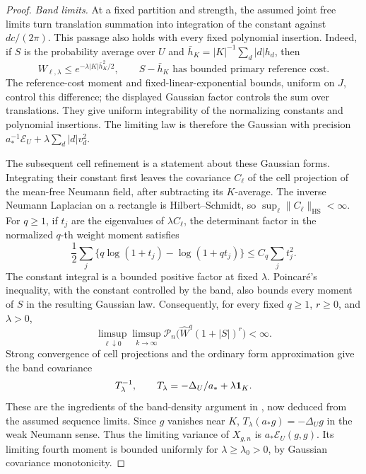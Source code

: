\begin{proof}
\emph{Band limits.}
At a fixed partition and strength, the assumed joint free limits turn
translation summation into integration of the constant against
\(dc/(2\pi)\).  This passage also holds with every fixed polynomial
insertion.  Indeed, if \(S\) is the probability average over \(U\) and
\(\bar h_K=|K|^{-1}\sum_d|d|h_d\), then
\[
 W_{\ell,\lambda}\le
       e^{-\lambda|K|\bar h_K^2/2},
 \qquad S-\bar h_K\text{ has bounded primary reference cost}.
\]
The reference-cost moment and fixed-linear-exponential bounds, uniform
on \(J\), control this difference; the displayed Gaussian factor
controls the sum over translations.  They give uniform integrability
of the normalizing constants and polynomial insertions.  The limiting
law is therefore the Gaussian with precision
\(a_*^{-1}\mathcal E_U+\lambda\sum_d|d|v_d^2\).

The subsequent cell refinement is a statement about these Gaussian
forms.  Integrating their constant first leaves the covariance
\(C_\ell\) of the cell projection of the mean-free Neumann field,
after subtracting its \(K\)-average.  The inverse Neumann Laplacian
on a rectangle is Hilbert--Schmidt, so
\(\sup_\ell\|C_\ell\|_{\mathrm{HS}}<\infty\).  For \(q\ge1\),
if \(t_j\) are the eigenvalues of \(\lambda C_\ell\), the determinant
factor in the normalized \(q\)-th weight moment satisfies
\[
 \frac12\sum_j\{q\log(1+t_j)-\log(1+qt_j)\}
                  \le C_q\sum_jt_j^2.
\]
The constant integral is a bounded positive factor at fixed \(\lambda\).
Poincar\'e's inequality, with the constant controlled by the band,
also bounds every moment of \(S\) in the resulting Gaussian law.
Consequently, for every fixed \(q\ge1\), \(r\ge0\), and \(\lambda>0\),
\begin{equation}\label{eq:profile-band-density}
 \limsup_{\ell\downarrow0}\limsup_{k\to\infty}
 \mathcal P_n\bigl(\widehat W^q(1+|S|)^r\bigr)<\infty.
\end{equation}
Strong convergence of cell projections and the ordinary form
approximation give the band covariance
\begin{equation}\label{eq:profile-band-Gaussian}
 T_\lambda^{-1},\qquad
 T_\lambda=-\Delta_U/a_*+\lambda\mathbf 1_K.
\end{equation}
These are the ingredients of the band-density argument in
\cite[Lemma~3.3]{X}, now deduced from the assumed sequence limits.
Since \(g\) vanishes near \(K\),
\(T_\lambda(a_*g)=-\Delta_Ug\) in the weak Neumann sense.  Thus the
limiting variance of \(X_{g,n}\) is \(a_*\mathcal E_U(g,g)\).
Its limiting fourth moment is bounded uniformly for
\(\lambda\ge\lambda_0>0\), by Gaussian covariance monotonicity.


\end{proof}
